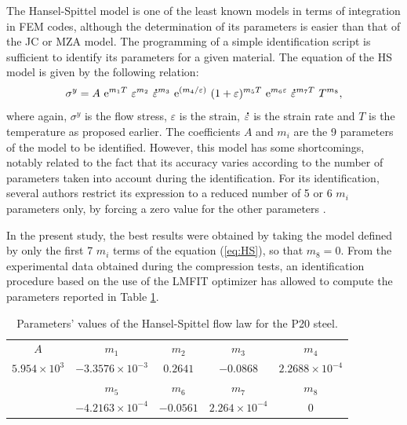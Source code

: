\documentclass[twoside,english,1p,final,sort&compress]{elsarticle}
\theoremstyle{plain}
\DeclareRobustCommand{\e}[1]{{\rm e}^{#1}}
\DeclareRobustCommand{\mdot}[1]{\accentset{\mbox{\bfseries .}}{#1}}
\begin{document}
The Hansel-Spittel model \cite{Hensel-1978} is one of the least known models in terms of integration in FEM codes, although the determination of its parameters is easier than that of the JC or MZA model.
The programming of a simple identification script is sufficient to identify its parameters for a given material.
The equation of the HS model is given by the following relation:
\begin{equation}
\sigma^y = A~\e{m_1T}~\varepsilon^{m_2}~\mdot\varepsilon^{m_3}~\e{({m_4}/{\varepsilon})}~(1+\varepsilon)^{m_5T}~\e{m_6\varepsilon}~\mdot\varepsilon^{m_7T}~T^{m_8}, \label{eq:HS}
\end{equation}
where again, $\sigma^y$ is the flow stress, $\varepsilon$ is the strain, $\mdot\varepsilon$ is the strain rate and $T$ is the temperature as proposed earlier.
The coefficients $A$ and $m_i$ are the 9 parameters of the model to be identified.
However, this model has some shortcomings, notably related to the fact that its accuracy varies according to the number of parameters taken into account during the identification.
For its identification, several authors restrict its expression to a reduced number of 5 or 6 $m_i$ parameters only, by forcing a zero value for the other parameters \cite{Chadha-2018, Mehtedi-2015, Rudnytskyj-2020}.

In the present study, the best results were obtained by taking the model defined by only the first 7 $m_i$ terms of the equation (\ref{eq:HS}), so that $m_8=0$.
From the experimental data obtained during the compression tests, an identification procedure based on the use of the LMFIT optimizer \cite{Newville-2016} has allowed to compute the parameters reported in Table \ref{tab:HS}.

\begin{table}[h!]
\centering
\caption{Parameters' values of the Hansel-Spittel flow law for the P20 steel.}
\begin{tabular}{ccccc}
	\hline
	        $A$          &         $m_1$          &   $m_2$   &        $m_3$         &         $m_4$         \\
	$5.954\times 10^{3}$ & $-3.3576\times10^{-3}$ & $0.2641$  &      $-0.0868$       & $2.2688\times10^{-4}$ \\ \hline
	                     &         $m_5$          &   $m_6$   &        $m_7$         &         $m_8$         \\
	                     & $-4.2163\times10^{-4}$ & $-0.0561$ & $2.264\times10^{-4}$ &          $0$          \\ \hline
\end{tabular}
\label{tab:HS}
\end{table}
\end{document}
